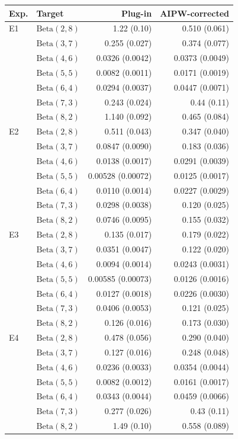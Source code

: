 \begin{tabular}{llrr}
\hline
Exp. & Target & Plug-in & AIPW-corrected \\
\hline
E1 & $\mathrm{Beta}(2,8)$ & 1.22 (0.10) & 0.510 (0.061) \\
 & $\mathrm{Beta}(3,7)$ & 0.255 (0.027) & 0.374 (0.077) \\
 & $\mathrm{Beta}(4,6)$ & 0.0326 (0.0042) & 0.0373 (0.0049) \\
 & $\mathrm{Beta}(5,5)$ & 0.0082 (0.0011) & 0.0171 (0.0019) \\
 & $\mathrm{Beta}(6,4)$ & 0.0294 (0.0037) & 0.0447 (0.0071) \\
 & $\mathrm{Beta}(7,3)$ & 0.243 (0.024) & 0.44 (0.11) \\
 & $\mathrm{Beta}(8,2)$ & 1.140 (0.092) & 0.465 (0.084) \\[3pt]
E2 & $\mathrm{Beta}(2,8)$ & 0.511 (0.043) & 0.347 (0.040) \\
 & $\mathrm{Beta}(3,7)$ & 0.0847 (0.0090) & 0.183 (0.036) \\
 & $\mathrm{Beta}(4,6)$ & 0.0138 (0.0017) & 0.0291 (0.0039) \\
 & $\mathrm{Beta}(5,5)$ & 0.00528 (0.00072) & 0.0125 (0.0017) \\
 & $\mathrm{Beta}(6,4)$ & 0.0110 (0.0014) & 0.0227 (0.0029) \\
 & $\mathrm{Beta}(7,3)$ & 0.0298 (0.0038) & 0.120 (0.025) \\
 & $\mathrm{Beta}(8,2)$ & 0.0746 (0.0095) & 0.155 (0.032) \\[3pt]
E3 & $\mathrm{Beta}(2,8)$ & 0.135 (0.017) & 0.179 (0.022) \\
 & $\mathrm{Beta}(3,7)$ & 0.0351 (0.0047) & 0.122 (0.020) \\
 & $\mathrm{Beta}(4,6)$ & 0.0094 (0.0014) & 0.0243 (0.0031) \\
 & $\mathrm{Beta}(5,5)$ & 0.00585 (0.00073) & 0.0126 (0.0016) \\
 & $\mathrm{Beta}(6,4)$ & 0.0127 (0.0018) & 0.0226 (0.0030) \\
 & $\mathrm{Beta}(7,3)$ & 0.0406 (0.0053) & 0.121 (0.025) \\
 & $\mathrm{Beta}(8,2)$ & 0.126 (0.016) & 0.173 (0.030) \\[3pt]
E4 & $\mathrm{Beta}(2,8)$ & 0.478 (0.056) & 0.290 (0.040) \\
 & $\mathrm{Beta}(3,7)$ & 0.127 (0.016) & 0.248 (0.048) \\
 & $\mathrm{Beta}(4,6)$ & 0.0236 (0.0033) & 0.0354 (0.0044) \\
 & $\mathrm{Beta}(5,5)$ & 0.0082 (0.0012) & 0.0161 (0.0017) \\
 & $\mathrm{Beta}(6,4)$ & 0.0343 (0.0044) & 0.0459 (0.0066) \\
 & $\mathrm{Beta}(7,3)$ & 0.277 (0.026) & 0.43 (0.11) \\
 & $\mathrm{Beta}(8,2)$ & 1.49 (0.10) & 0.558 (0.089) \\
\hline
\end{tabular}
